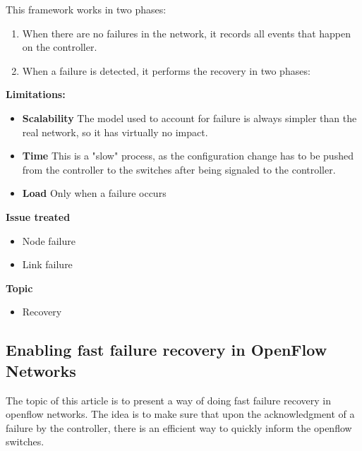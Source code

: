 \documentclass[compsoc]{IEEEtran}
\begin{document}
This framework works in two phases:
\begin{enumerate}
	\item When there are no failures in the network, it records all events that happen on the controller.
	\item When a failure is detected, it performs the recovery in two phases:
\end{enumerate}

\textbf{Limitations:}
\begin{itemize}
	\item \textbf{Scalability} The model used to account for failure is always simpler than the real network, so it has virtually no impact.
	\item \textbf{Time} This is a "slow" process, as the configuration change has to be pushed from the controller to the switches after being signaled to the controller.
	\item \textbf{Load} Only when a failure occurs
\end{itemize}

\textbf{Issue treated}
\begin{itemize}
	\item Node failure
	\item Link failure
\end{itemize}

\textbf{Topic}
\begin{itemize}
	\item Recovery
\end{itemize}

\subsection{Enabling fast failure recovery in OpenFlow Networks \cite{2911632}}
The topic of this article is to present a way of doing fast failure recovery in openflow networks.
The idea is to make sure that upon the acknowledgment of a failure by the controller, there is an efficient way to quickly inform the openflow switches.
\end{document}
